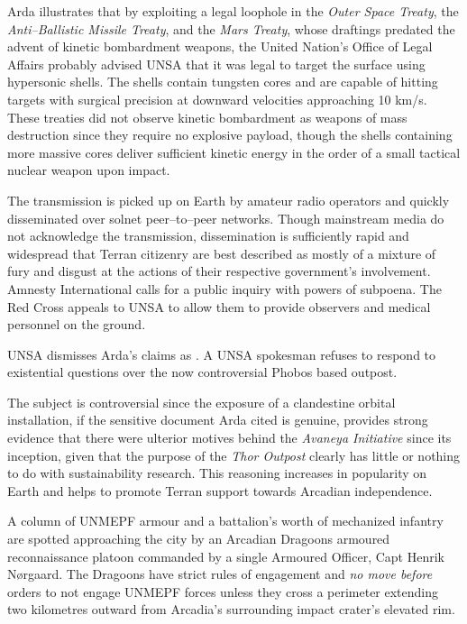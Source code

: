 Arda illustrates that by exploiting a legal loophole in the {\it Outer Space Treaty}, the {\it Anti--Ballistic Missile Treaty}, and the {\it Mars Treaty}, whose draftings predated the advent of kinetic bombardment weapons, the United Nation's Office of Legal Affairs probably advised UNSA that it was legal to target the surface using hypersonic shells. The shells contain tungsten cores and are capable of hitting targets with surgical precision at downward velocities approaching 10 km/s. These treaties did not observe kinetic bombardment as weapons of mass destruction since they require no explosive payload, though the shells containing more massive cores deliver sufficient kinetic energy in the order of a small tactical nuclear weapon upon impact.

The transmission is picked up on Earth by amateur radio operators and quickly disseminated over solnet peer--to--peer networks. Though mainstream media do not acknowledge the transmission, dissemination is sufficiently rapid and widespread that Terran citizenry are best described as mostly of a mixture of fury and disgust at the actions of their respective government's involvement. Amnesty International calls for a public inquiry with powers of subpoena. The Red Cross appeals to UNSA to allow them to provide observers and medical personnel on the ground.

UNSA dismisses Arda's claims as . A UNSA spokesman refuses to respond to existential questions over the now controversial Phobos based outpost. 

The subject is controversial since the exposure of a clandestine orbital installation, if the sensitive document Arda cited is genuine, provides strong evidence that there were ulterior motives behind the {\it Avaneya Initiative} since its inception, given that the purpose of the {\it Thor Outpost} clearly has little or nothing to do with sustainability research. This reasoning increases in popularity on Earth and helps to promote Terran support towards Arcadian independence.
\StopTimelineDate

A column of UNMEPF armour and a battalion's worth of mechanized infantry are spotted approaching the city by an Arcadian Dragoons armoured reconnaissance platoon commanded by a single Armoured Officer, Capt Henrik Nørgaard. The Dragoons have strict rules of engagement and {\it no move before} orders to not engage UNMEPF forces unless they cross a perimeter extending two kilometres outward from Arcadia's surrounding impact crater's elevated rim.


